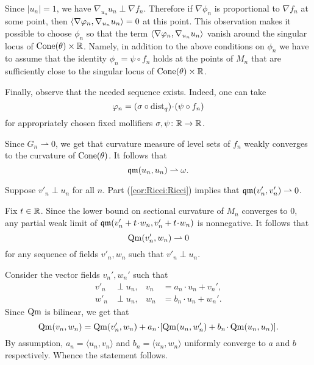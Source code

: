 Since $|u_n|=1$, we have $\nabla_{u_n} u_n\perp \nabla f_n$.
Therefore if $\nabla \phi_n$ is proportional to $\nabla f_n$ at some point, then  $\langle\nabla\varphi_n,\nabla_{u_n} {u_n}\rangle=0$ at this point.
This observation makes it possible to choose $\phi_n$ so that the term $\langle\nabla\varphi_n,\nabla_{u_n} {u_n}\rangle$ vanish around the singular locus of $\operatorname{Cone}(\theta)\times \mathbb{R}$.
Namely, in addition to the above conditions on $\phi_n$ we have to assume that the identity $\phi_n=\psi\circ f_n$ holds at the points of $M_n$ that are sufficiently close to the singular locus of $\operatorname{Cone}(\theta)\times \mathbb{R}$.

Finally, observe that the needed sequence exists.
Indeed, one can take 
\[\phi_n=(\sigma\circ \dist_q)\cdot (\psi\circ f_n)\]
for appropriately chosen fixed mollifiers $\sigma,\psi\colon\mathbb{R}\to \mathbb{R}$.

Since $G_n\rightharpoonup 0$, we get that curvature measure of level sets of $f_n$ weakly converges to the curvature of $\operatorname{Cone}(\theta)$.
It follows that 
\[\operatorname{\mathfrak{qm}}(u_n,u_n)\rightharpoonup \omega.\]

Suppose $v'_n\perp u_n$ for all $n$.
Part (\ref{cor:Ricci:Ricci}) implies that  $\qm(v'_n,v'_n)\zz\rightharpoonup 0$.

Fix $t\in \mathbb{R}$.
Since the lower bound on sectional curvature of $M_n$ converges to $0$, any partial weak limit of $\qm(v'_n\zz+t\cdot w_n,v'_n\zz+t\cdot w_n)$ is nonnegative.
It follows that 
\[\operatorname{\rm Qm}(v'_n, w_n)\rightharpoonup 0\] for any sequence of fields $v'_n,w_n$ such that $v'_n\perp u_n$.

Consider the vector fields $v_n',w_n'$ such that 
\begin{align*}
v'_n&\perp u_n,
&
v_n&=a_n\cdot u_n+v_n',
\\
w'_n&\perp u_n,
&
w_n&=b_n\cdot u_n+w_n'.
\end{align*}
Since $\operatorname{\rm Qm}$ is bilinear, we get that
\[\Qm(v_n,w_n)=\Qm(v_n',w_n) + a_n\cdot [\Qm(u_n,w_n')+ b_n\cdot \Qm(u_n,u_n)].\]
By assumption, $a_n=\langle u_n,v_n\rangle $ and $b_n=\langle u_n,w_n\rangle$ uniformly converge to $a$ and $b$ respectively.
Whence the statement follows.
\qeds


